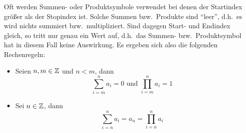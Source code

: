 Oft werden Summen- oder Produktsymbole verwendet bei denen der Startindex 
größer als der Stopindex ist. Solche Summen bzw.~Produkte sind "`leer"', 
d.h.~es wird nichts summiert bzw.~multipliziert. Sind dagegen Start- und
Endindex gleich, so tritt nur genau ein Wert auf, d.h.~das Summen- 
bzw.~Produktsymbol hat in diesem Fall keine Auswirkung. Es ergeben sich
also die folgenden Rechenregeln:
\begin{itemize}
%
\item Seien $n, m \in \mathbb Z$ und $n < m$, dann 
\begin{displaymath}
\sum_{i=m}^n a_i = 0  \text{ und } \prod_{i = m}^n a_i = 1
\end{displaymath}
%
\item Sei $n \in \mathbb Z$, dann 
\begin{displaymath}
\sum_{i=n}^n a_i = a_n = \prod_{i = n}^n a_i
\end{displaymath}
\end{itemize}


